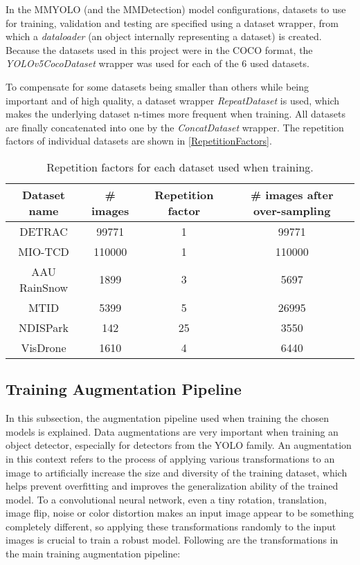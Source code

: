 In the MMYOLO (and the MMDetection) model configurations, datasets to use for
training, validation and testing are specified using a dataset wrapper, from
which a \textit{dataloader} (an object internally representing a dataset) is
created. Because the datasets used in this project were in the COCO format, the
\textit{YOLOv5CocoDataset} wrapper was used for each of the 6 used datasets.

To compensate for some datasets being smaller than others while being important
and of high quality, a dataset wrapper \textit{RepeatDataset} is used, which
makes the underlying dataset n-times more frequent when training. All datasets are finally
concatenated into one by the \textit{ConcatDataset} wrapper. The repetition
factors of individual datasets are shown in \autoref{RepetitionFactors}.

\begin{table}[h]
\centering
\small
\begin{tabular}{|c|c|c|c|}
    \hline
    Dataset name & \# images & Repetition factor & \# images after over-sampling \\
    \hline
    DETRAC       &  \num{99771} &  1 & \num{99771} \\
    MIO-TCD      & \num{110000} &  1 & \num{110000} \\
    AAU RainSnow &   \num{1899} &  3 & \num{5697} \\
    MTID         &   \num{5399} &  5 & \num{26995} \\
    NDISPark     &    \num{142} & 25 & \num{3550} \\
    VisDrone     &   \num{1610} &  4 & \num{6440} \\
    \hline
\end{tabular}
\caption{Repetition factors for each dataset used when training.}
\label{RepetitionFactors}
\end{table}



\subsection{Training Augmentation Pipeline}

In this subsection, the augmentation pipeline used when training the chosen
models is explained. Data augmentations are very important when training an
object detector, especially for detectors from the YOLO family. An augmentation
in this context refers to the process of applying various transformations to an
image to artificially increase the size and diversity of the training dataset,
which helps prevent overfitting and improves the generalization ability of the
trained model. To a convolutional neural network, even a tiny rotation,
translation, image flip, noise or color distortion makes an input image appear
to be something completely different, so applying these transformations randomly
to the input images is crucial to train a robust model. Following are the
transformations in the main training augmentation pipeline:


